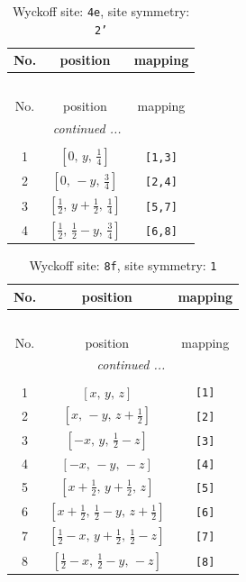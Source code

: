 \documentclass[fleqn,8pt]{jsarticle}
\begin{document}
\renewcommand{\arraystretch}{1.2}
\begin{longtable}{ccc}
\caption{Wyckoff site: {\tt 4e}, site symmetry: {\tt 2'}}
 \\
 \hline \hline
No. & position & mapping \\ \hline \endfirsthead

\multicolumn{2}{l}{\tablename\ \thetable{}} \\
 \hline \hline
No. & position & mapping \\ \hline \endhead

 \hline \hline
\multicolumn{2}{r}{\footnotesize\it continued ...} \\ \endfoot

 \hline \hline
\multicolumn{2}{r}{} \\ \endlastfoot

1 & $\left[ 0,\, y,\, \frac{1}{4} \right]$ & {\tt [1,3]} \\ \hline
2 & $\left[ 0,\, - y,\, \frac{3}{4} \right]$ & {\tt [2,4]} \\ \hline
3 & $\left[ \frac{1}{2},\, y + \frac{1}{2},\, \frac{1}{4} \right]$ & {\tt [5,7]} \\ \hline
4 & $\left[ \frac{1}{2},\, \frac{1}{2} - y,\, \frac{3}{4} \right]$ & {\tt [6,8]} \\
\end{longtable}
\renewcommand{\arraystretch}{1.2}
\begin{longtable}{ccc}
\caption{Wyckoff site: {\tt 8f}, site symmetry: {\tt 1}}
 \\
 \hline \hline
No. & position & mapping \\ \hline \endfirsthead

\multicolumn{2}{l}{\tablename\ \thetable{}} \\
 \hline \hline
No. & position & mapping \\ \hline \endhead

 \hline \hline
\multicolumn{2}{r}{\footnotesize\it continued ...} \\ \endfoot

 \hline \hline
\multicolumn{2}{r}{} \\ \endlastfoot

1 & $\left[ x,\, y,\, z \right]$ & {\tt [1]} \\ \hline
2 & $\left[ x,\, - y,\, z + \frac{1}{2} \right]$ & {\tt [2]} \\ \hline
3 & $\left[ - x,\, y,\, \frac{1}{2} - z \right]$ & {\tt [3]} \\ \hline
4 & $\left[ - x,\, - y,\, - z \right]$ & {\tt [4]} \\ \hline
5 & $\left[ x + \frac{1}{2},\, y + \frac{1}{2},\, z \right]$ & {\tt [5]} \\ \hline
6 & $\left[ x + \frac{1}{2},\, \frac{1}{2} - y,\, z + \frac{1}{2} \right]$ & {\tt [6]} \\ \hline
7 & $\left[ \frac{1}{2} - x,\, y + \frac{1}{2},\, \frac{1}{2} - z \right]$ & {\tt [7]} \\ \hline
8 & $\left[ \frac{1}{2} - x,\, \frac{1}{2} - y,\, - z \right]$ & {\tt [8]} \\
\end{longtable}
\end{document}
